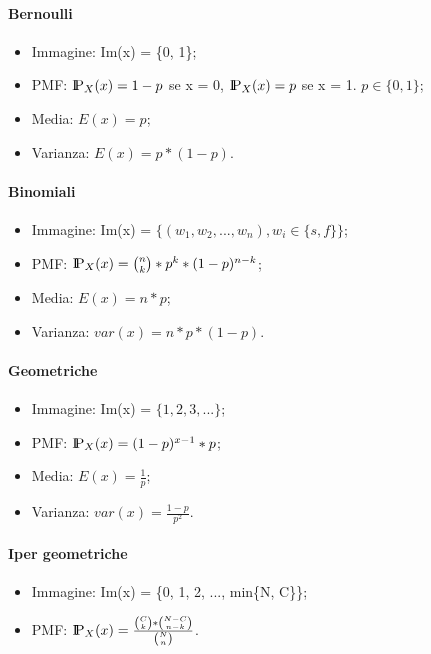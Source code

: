 \paragraph{Bernoulli}

\begin{itemize}
    \item Immagine: Im(x) = \{0, 1\};
    \item PMF: $\text{I\kern-0.2 em P}_X(x) =  1 - p $ se x = 0,  $\text{I\kern-0.2 em P}_X(x) =  p $ se x = 1. $p \in \{0, 1\}$;
    \item Media: $E(x) = p$;
    \item Varianza: $E(x) = p * (1 - p)$.
\end{itemize}

\paragraph{Binomiali}

\begin{itemize}
    \item Immagine: Im(x) = $\{(w_1, w_2, ..., w_n), w_i \in \{s, f\}\}$;
    \item PMF: $\text{I\kern-0.2 em P}_X(x) =  \binom{n}{k} * p^k * (1- p)^{n-k}$;
    \item Media: $E(x) = n * p$;
    \item Varianza: $var(x) = n * p * (1-p)$.
\end{itemize}

\paragraph{Geometriche}

\begin{itemize}
    \item Immagine: Im(x) = $\{1, 2, 3, ...\}$;
    \item PMF: $\text{I\kern-0.2 em P}_X(x) =  (1 - p)^{x - 1} * p$;
    \item Media: $E(x) = \frac{1}{p}$;
    \item Varianza: $var(x) = \frac{1 - p}{p^2}$.
\end{itemize}

\paragraph{Iper geometriche}

\begin{itemize}
    \item Immagine: Im(x) = \{0, 1, 2, ..., min\{N, C\}\};
    \item PMF: $\text{I\kern-0.2 em P}_X(x) =  \frac{\binom{C}{k} * \binom{N - C}{n - k}}{\binom{N}{n}}$.
\end{itemize}

